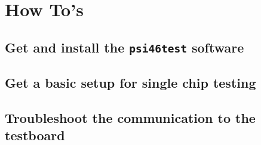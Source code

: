 \chapter{How To's}
\label{sec:howto}

\section{Get and install the \texttt{psi46test} software}

\section{Get a basic setup for single chip testing}

\section{Troubleshoot the communication to the testboard}

